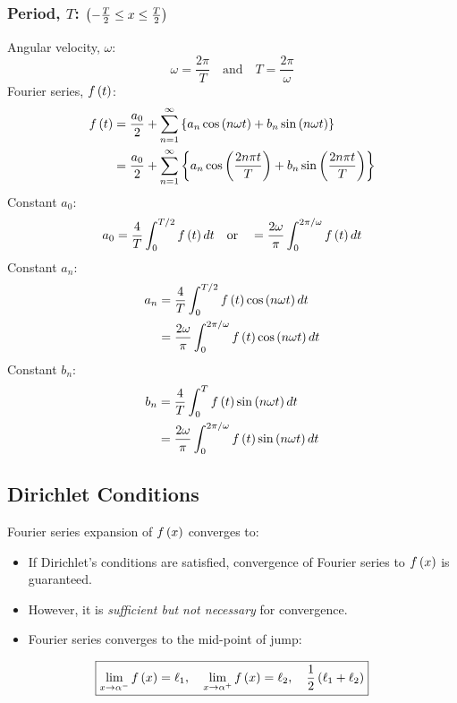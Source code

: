 \subsubsection{Period, $T$: $\left(-\frac{T}{2}\leq x\leq \frac{T}{2}\right)$}
Angular velocity, $\omega$:
\begin{equation}
    \omega=\frac{2\pi}{T}\quad\text{and}\quad T=\frac{2\pi}{\omega}
\end{equation}
Fourier series, $f\left(t\right)$:
\begin{align}
    f\left(t\right)&=\frac{a_0}{2}+\sum_{n=1}^{\infty}\left\{a_n\cos\left(n\omega t\right)+b_n\sin\left(n\omega t\right)\right\}\\
    &=\frac{a_0}{2}+\sum_{n=1}^{\infty}\left\{a_n\cos\left(\frac{2n\pi t}{T}\right)+b_n\sin\left(\frac{2n\pi t}{T}\right)\right\}
\end{align}
Constant $a_0$:
\begin{equation}
    a_0=\frac{4}{T}\int_{0}^{T/2}f\left(t\right)dt\quad\text{or}\quad=\frac{2\omega}{\pi}\int_{0}^{2\pi/\omega}f\left(t\right)dt
\end{equation}
Constant $a_n$:
\begin{align}
    a_n&=\frac{4}{T}\int_{0}^{T/2}f\left(t\right)\cos\left(n\omega t\right)dt\\
    &=\frac{2\omega}{\pi}\int_{0}^{2\pi/\omega}f\left(t\right)\cos\left(n\omega t\right)dt\nonumber
\end{align}
Constant $b_n$:
\begin{align}
    b_n&=\frac{4}{T}\int_{0}^{T}f\left(t\right)\sin\left(n\omega t\right)dt\\
    &=\frac{2\omega}{\pi}\int_{0}^{2\pi/\omega}f\left(t\right)\sin\left(n\omega t\right)dt\nonumber
\end{align}
\subsection{Dirichlet Conditions}
Fourier series expansion of $f\left(x\right)$ converges to:
\begin{center}
\end{center}
\begin{itemize}
    \item If Dirichlet's conditions are satisfied, convergence of Fourier series to $f\left(x\right)$ is guaranteed.
    \item However, it is \textit{sufficient but not necessary} for convergence.
    \item Fourier series converges to the mid-point of jump:
\end{itemize}
\begin{equation}
    \boxed{\lim\limits_{x \to \alpha^-}f\left(x\right)=\ell_1,\quad \lim\limits_{x \to \alpha^+}f\left(x\right)=\ell_2,\quad\frac{1}{2}\left(\ell_1+\ell_2\right)}
\end{equation}
